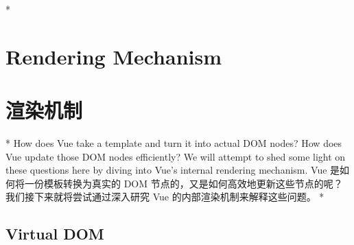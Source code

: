 
\begin{paracol}{2} 
 
\switchcolumn[0]*%
\section{Rendering Mechanism}
\switchcolumn
\section{渲染机制}
\switchcolumn[0]*%
How does Vue take a template and turn it into actual DOM nodes? How does
Vue update those DOM nodes efficiently? We will attempt to shed some
light on these questions here by diving into Vue's internal rendering
mechanism.
\switchcolumn
Vue 是如何将一份模板转换为真实的 DOM
节点的，又是如何高效地更新这些节点的呢？我们接下来就将尝试通过深入研究
Vue 的内部渲染机制来解释这些问题。
\switchcolumn[0]*%
\subsection{Virtual DOM}
\switchcolumn

\end{paracol}
